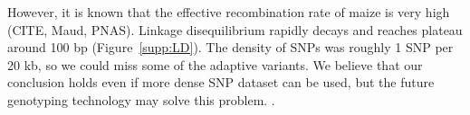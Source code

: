 \label{other explanations}



\label{low power}
However, it is known that the effective recombination rate of maize is very high (CITE, Maud, PNAS).
Linkage disequilibrium rapidly decays and reaches plateau around 100 bp (Figure~\ref{supp:LD}).
The density of SNPs was roughly 1 SNP per 20 kb, so we could miss some of the adaptive variants.
We believe that our conclusion holds even if more dense SNP dataset can be used, but the future genotyping technology may solve this problem.
\cite[]{tiffin2014advances}.

